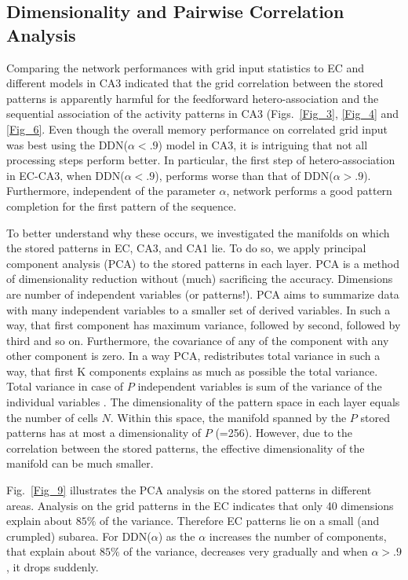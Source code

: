 \documentclass[utf8]{frontiersSCNS} %
\begin{document}
\subsection{Dimensionality and Pairwise Correlation Analysis}

Comparing the network performances with grid input statistics to EC and
different models in CA3 indicated that the grid correlation between the stored patterns is apparently harmful for the feedforward hetero-association and the sequential association of the activity patterns in CA3 (Figs.~\ref{Fig_3}, \ref{Fig_4} and \ref{Fig_6}. 
%
Even though the overall memory performance on correlated grid input
was best using the DDN($\alpha < .9$) model in CA3, it is intriguing that not all processing steps perform better. In particular, the first step of hetero-association in EC-CA3, when DDN($\alpha < .9$), performs worse than that of DDN($\alpha > .9$).
%
Furthermore, independent of the parameter $\alpha$, network performs a good pattern completion for the first pattern of the sequence. 
%

To better understand why these occurs, we investigated the manifolds on which the stored patterns in EC, CA3, and CA1 lie. 
%
To do so, we apply principal component analysis (PCA) to the stored patterns in each layer. 
%
PCA is a method of dimensionality reduction without (much) sacrificing the accuracy. Dimensions are number of independent variables (or patterns!). PCA aims to summarize data with many independent variables to a smaller set of derived variables. In such a way, that first component has maximum variance, followed by second, followed by third and so on. Furthermore, the covariance of any of the component with any other component is zero.
In a way PCA, redistributes total variance in such a way, that first K components explains as much as possible the total variance. Total variance in case of $P$ independent variables is sum of the variance of the individual variables \citep[chapter 4]{Hastie2009}.
%
The dimensionality of the pattern space in each layer equals the number of cells $N$. Within this space, the manifold spanned by the $P$ stored patterns has at most a dimensionality of $P$ (=256). However, due to the correlation between the stored patterns, the effective dimensionality of the manifold can be much smaller.
%

Fig.~\ref{Fig_9} illustrates the PCA analysis on the stored patterns in different areas. Analysis on the grid patterns in the EC indicates that only 40 dimensions explain about $85 \%$ of the variance. Therefore EC patterns lie on a small (and crumpled) subarea. 
%
For DDN($\alpha$) as the $\alpha$ increases the number of components, that explain about $85 \%$ of the variance, decreases very gradually and when $\alpha > .9$, it drops suddenly.  
\end{document}
